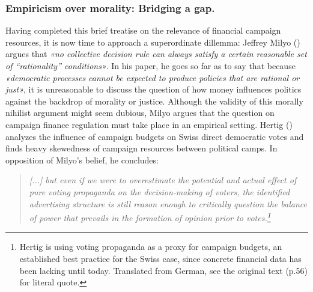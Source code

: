\documentclass[11pt,a4paper]{article}
\begin{document}
\subsubsection{Empiricism over morality: Bridging a gap.}
Having completed this brief treatise on the relevance of financial campaign resources, it is now time to approach a superordinate dillemma: Jeffrey Milyo (\citeyear{milyo_political_1999,milyo_state_2012}) argues that \textit{«no collective decision rule can always satisfy a certain reasonable set of “rationality” conditions»}. In his \citeyear{scott_money_2015} paper, he goes so far as to say that because \textit{«democratic processes cannot be expected to produce policies that are rational or just»}, it is unreasonable to discuss the question of how money influences politics against the backdrop of morality or justice. Although the validity of this morally nihilist argument might seem dubious, Milyo argues that the question on campaign finance regulation must take place in an empirical setting. Hertig (\citeyear{hertig_sind_1982}) analyzes the influence of campaign budgets on Swiss direct democratic votes and finds heavy skewedness of campaign resources between political camps. In opposition of Milyo’s belief, he concludes:
\begin{quote}
\textit{[...] but even if we were to overestimate the potential and actual effect of pure voting propaganda on the decision-making of voters, the identified advertising structure is still reason enough to critically question the balance of power that prevails in the formation of opinion prior to votes.\footnote{ Hertig is using voting propaganda as a proxy for campaign budgets, an established best practice for the Swiss case, since concrete financial data has been lacking until today. Translated from German, see the original text (p.56) for literal quote.}}
\end{quote}
\end{document}
